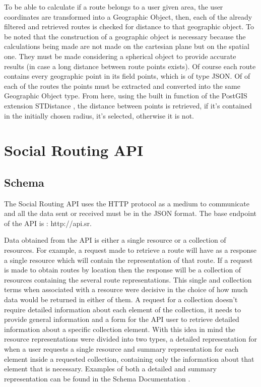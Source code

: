     To be able to calculate if a route belongs to a user given area, the user coordinates are transformed into a Geographic Object\cite{geographicobject},
    then, each of the already filtered and retrieved routes is checked for distance to that geographic object. To be noted that the construction of a geographic
    object is necessary because the calculations being made are not made on the cartesian plane but on the spatial one. They must be made considering a spherical 
    object to provide accurate results (in case a long distance between route points exists). Of course each route contains every geographic point in its field points,
    which is of type JSON. Of of each of the routes the points must be extracted and converted into the same Geographic Object type. From here, using the built in function
    of the PostGIS extension STDistance \cite{stdistance}, the distance between points is retrieved, if it's contained in the initially 
    chosen radius, it's selected, otherwise it is not.

\section*{Social Routing API}    
    \subsection*{Schema}
        The Social Routing API uses the HTTP protocol as a medium to 
        communicate and all the data sent or received must be in the JSON format.
        The base endpoint of the API is : http://api.sr.\par
        Data obtained from the API is either a single resource or a collection of resources. For example, a request
        made to retrieve a route will have as a response a single resource which will contain the representation of that
        route. If a request is made to obtain routes by location then the response will be a collection of resources containing
        the several route representations. This single and collection terms when associated with a
        resource were decisive in the choice of how much data would be returned in either of them. A request for a collection
        doesn't require detailed information about each element of the collection, it needs to provide general information and
        a form for the API user to retrieve detailed information about a specific collection element.
        With this idea in mind the resource representations were divided into two types, a detailed representation for when a user
        requests a single resource and summary representation for each element inside a requested collection, containing only the 
        information about that element that is necessary.
        Examples of both a detailed and summary representation can be found in the Schema Documentation \cite{schemadocs}.    
    
